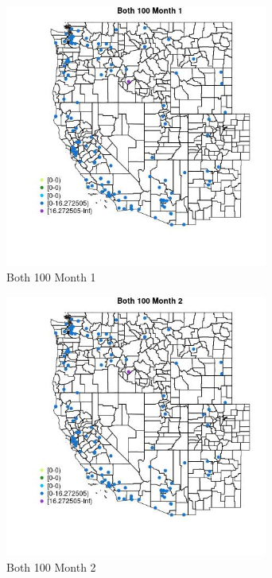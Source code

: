 \begin{figure} 
\centering  
\includegraphics[width=0.77\textwidth]{Code_Outputs/Report_ML_input_PM25_Step4_part_e_de_duplicated_aves_MapObsMo1Both_100.jpg} 
\caption{\label{fig:Report_ML_input_PM25_Step4_part_e_de_duplicated_avesMapObsMo1Both_100}Both 100 Month 1} 
\end{figure} 
 

\begin{figure} 
\centering  
\includegraphics[width=0.77\textwidth]{Code_Outputs/Report_ML_input_PM25_Step4_part_e_de_duplicated_aves_MapObsMo2Both_100.jpg} 
\caption{\label{fig:Report_ML_input_PM25_Step4_part_e_de_duplicated_avesMapObsMo2Both_100}Both 100 Month 2} 
\end{figure} 
 

